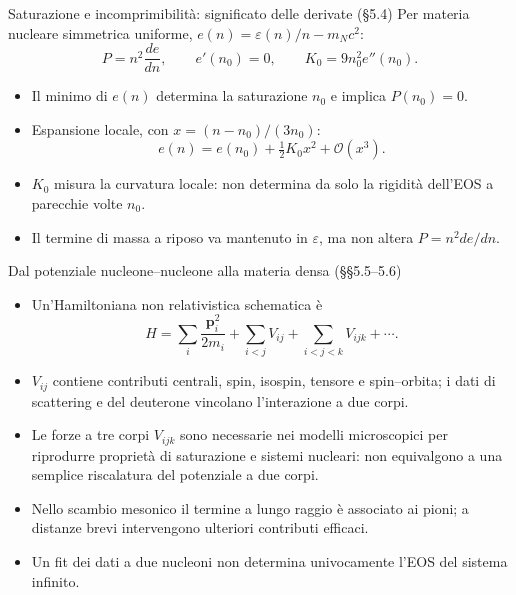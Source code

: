 \begin{frame}[t]{Saturazione e incomprimibilità: significato delle derivate (§5.4)}
\small
Per materia nucleare simmetrica uniforme, $e(n)=\varepsilon(n)/n-m_Nc^2$:
\[
P=n^2\frac{de}{dn},\qquad e'(n_0)=0,\qquad
K_0=9n_0^2e''(n_0).
\]
\begin{itemize}
\item Il minimo di $e(n)$ determina la saturazione $n_0$ e implica $P(n_0)=0$.
\item Espansione locale, con $x=(n-n_0)/(3n_0)$:
\[
e(n)=e(n_0)+\tfrac12K_0x^2+\mathcal O(x^3).
\]
\item $K_0$ misura la curvatura locale: non determina da solo la rigidità dell'EOS a parecchie volte $n_0$.
\item Il termine di massa a riposo va mantenuto in $\varepsilon$, ma non altera $P=n^2 de/dn$.
\end{itemize}
\end{frame}

\begin{frame}[t]{Dal potenziale nucleone--nucleone alla materia densa (§§5.5--5.6)}
\small
\begin{itemize}
\item Un'Hamiltoniana non relativistica schematica è
\[
H=\sum_i\frac{\mathbf p_i^2}{2m_i}+\sum_{i<j}V_{ij}
+\sum_{i<j<k}V_{ijk}+\cdots.
\]
\item $V_{ij}$ contiene contributi centrali, spin, isospin, tensore e spin--orbita; i dati di scattering e del deuterone vincolano l'interazione a due corpi.
\item Le forze a tre corpi $V_{ijk}$ sono necessarie nei modelli microscopici per riprodurre proprietà di saturazione e sistemi nucleari: non equivalgono a una semplice riscalatura del potenziale a due corpi.
\item Nello scambio mesonico il termine a lungo raggio è associato ai pioni; a distanze brevi intervengono ulteriori contributi efficaci.
\item Un fit dei dati a due nucleoni non determina univocamente l'EOS del sistema infinito.
\end{itemize}
\end{frame}


